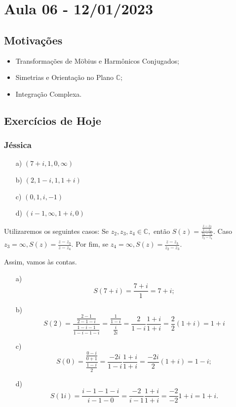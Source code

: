 \documentclass[ComplexAnalysis/complex.tex]{subfiles}
\begin{document}
\section{Aula 06 - 12/01/2023}
\subsection{Motivações}
\begin{itemize}
	\item Transformações de M\"{o}bius e Harm\^onicos Conjugados;
	\item Simetrias e Orientação no Plano $\mathbb{C};$
	\item Integração Complexa.
\end{itemize}
\subsection{Exercícios de Hoje }
\subsubsection{Jéssica}
\begin{itemize}
	\item[a)] $(7+i, 1, 0, \infty)$
	\item[b)] $(2, 1-i, 1, 1+i)$
	\item[c)] $(0, 1, i, -1)$
	\item[d)] $(i-1, \infty, 1+i, 0)$
\end{itemize}
Utilizaremos os seguintes casos: Se $z_{2}, z_{3}, z_{4}\in \mathbb{C},$ então $S(z) = \displaystyle \frac{\frac{z-z_{3}}{z-z_{4}}}{\frac{z_{2} - z_{3}}{z_{2} - z_{4}}}.$
Caso $z_{3} = \infty, \displaystyle S(z) = \frac{z - z_{3}}{z - z_{4}}.$ Por fim, se $z_{4} = \infty, S(z) = \displaystyle \frac{z - z_{3}}{z_{2} - z_{3}}.$

Assim, vamos às contas.
\begin{itemize}
	\item[a)] $$S(7 + i) = \frac{7 + i}{1} = 7 + i;$$
	\item[b)] $$S(2) = \frac{\frac{2 -1}{2 - 1 - i}}{\frac{1 - i - 1}{1 - i - 1 - i}} = \frac{\frac{1}{1-i}}{\frac{i}{2i}} = \frac{2}{1-i}\frac{1+i}{1+i} = \frac{2}{2}(1 + i) = 1 + i$$
	\item[c)] $$S(0) = \frac{\frac{0-i}{0+1}}{\frac{1-i}{2}} = \frac{-2i}{1-i}\frac{1+i}{1+i} = \frac{-2i}{2}(1+i) = 1-i;$$
	\item[d)] $$S(1i) = \frac{i-1-1-i}{i-1-0} = \frac{-2}{i-1}\frac{1+i}{1+i} = \frac{-2}{-2}1+i = 1+i.$$
\end{itemize}
\end{document}
